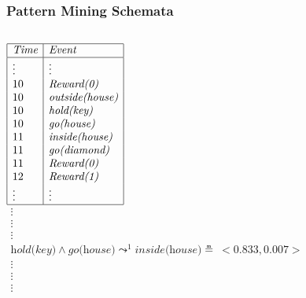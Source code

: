 \documentclass[aspectratio=169]{beamer}
\newcommand{\lpreimp}[1]{\leadsto^{#1}}
\begin{document}
\begin{frame}
  \frametitle{Pattern Mining Schemata}


  \begin{columns}
    \column{3cm}
    $
    \begin{array}{|l|l|}
      \hline
      \textit{Time} & \textit{Event} \\
      \hline
      \vdots & \vdots \\
      10 & \textit{Reward(0)} \\
      10 & \textit{outside(house)} \\
      10 & \textit{hold(key)} \\
      10 & \textit{go(house)} \\
      11 & \textit{inside(house)} \\
      11 & \textit{go(diamond)} \\
      11 & \textit{Reward(0)} \\
      12 & \textit{Reward(1)} \\
      \vdots & \vdots \\
      \hline
    \end{array}
    $
    \column{9cm}
    $
    \begin{array}{c}
      \vdots \\
      \vdots \\
      \vdots \\
      \textit{hold(key)} \land \textit{go(house)} \lpreimp{1}
      \textit{inside(house)} \measeq\ <\!0.833, 0.007\!> \\
      \vdots \\
      \vdots \\
      \vdots
    \end{array}
    $
  \end{columns}


\end{frame}
\end{document}
